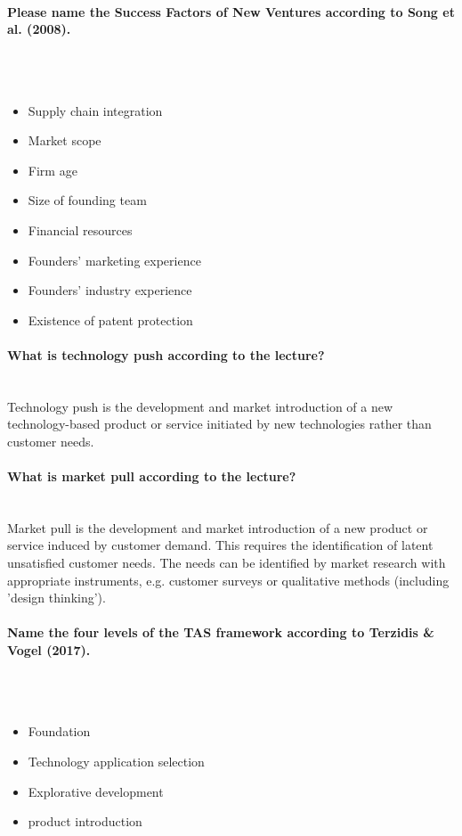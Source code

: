 \documentclass[10pt,a4paper,noendnumber=true]{scrartcl}
\newcommand{\properparagraph}[1]{\paragraph{\textcolor{Emerald}{#1}}\mbox{}\\}
\begin{document}
\properparagraph{Please name the Success Factors of New Ventures according to Song et al. (2008).}
\\[-6ex]
\begin{itemize}
	\item Supply chain integration
	\item Market scope
	\item Firm age
	\item Size of founding team
	\item Financial resources
	\item Founders' marketing experience
	\item Founders' industry experience
	\item Existence of patent protection
\end{itemize}

\properparagraph{What is technology push according to the lecture?}
Technology push is the development and market introduction of a new technology-based product or service initiated by new technologies rather than customer needs.

\properparagraph{What is market pull according to the lecture?}
Market pull is the development and market introduction of a new product or service induced by customer demand. This requires the identification of latent unsatisfied customer needs. The needs can be identified by market research with appropriate instruments, e.g. customer surveys or qualitative methods (including 'design thinking').

\properparagraph{Name the four levels of the TAS framework according to Terzidis \& Vogel (2017).}
\\[-6ex]
\begin{itemize}
	\item Foundation
	\item Technology application selection
	\item Explorative development
	\item product introduction
\end{itemize}
\end{document}

